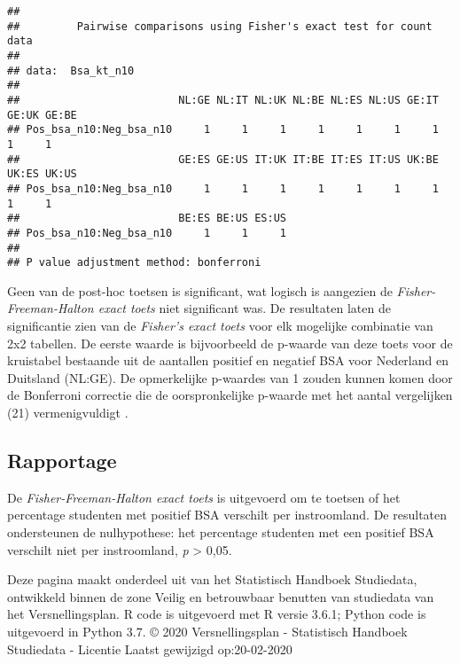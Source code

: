 \documentclass[
]{article}
\begin{document}
\begin{verbatim}
## 
##         Pairwise comparisons using Fisher's exact test for count data
## 
## data:  Bsa_kt_n10
## 
##                         NL:GE NL:IT NL:UK NL:BE NL:ES NL:US GE:IT GE:UK GE:BE
## Pos_bsa_n10:Neg_bsa_n10     1     1     1     1     1     1     1     1     1
##                         GE:ES GE:US IT:UK IT:BE IT:ES IT:US UK:BE UK:ES UK:US
## Pos_bsa_n10:Neg_bsa_n10     1     1     1     1     1     1     1     1     1
##                         BE:ES BE:US ES:US
## Pos_bsa_n10:Neg_bsa_n10     1     1     1
## 
## P value adjustment method: bonferroni
\end{verbatim}

Geen van de post-hoc toetsen is significant, wat logisch is aangezien de
\emph{Fisher-Freeman-Halton exact toets} niet significant was. De
resultaten laten de significantie zien van de \emph{Fisher's exact
toets} voor elk mogelijke combinatie van 2x2 tabellen. De eerste waarde
is bijvoorbeeld de p-waarde van deze toets voor de kruistabel bestaande
uit de aantallen positief en negatief BSA voor Nederland en Duitsland
(NL:GE). De opmerkelijke p-waardes van 1 zouden kunnen komen door de
Bonferroni correctie die de oorspronkelijke p-waarde met het aantal
vergelijken (21) vermenigvuldigt .

\hypertarget{rapportage-1}{%
\subsection{Rapportage}\label{rapportage-1}}

De \emph{Fisher-Freeman-Halton exact toets} is uitgevoerd om te toetsen
of het percentage studenten met positief BSA verschilt per instroomland.
De resultaten ondersteunen de nulhypothese: het percentage studenten met
een positief BSA verschilt niet per instroomland, \emph{p}
\textgreater{} 0,05.

\leavevmode\hypertarget{footer}{}%
Deze pagina maakt onderdeel uit van het Statistisch Handboek Studiedata,
ontwikkeld binnen de zone Veilig en betrouwbaar benutten van studiedata
van het Versnellingsplan. R code is uitgevoerd met R versie 3.6.1;
Python code is uitgevoerd in Python 3.7. © 2020 Versnellingsplan -
Statistisch Handboek Studiedata - Licentie Laatst gewijzigd
op:20-02-2020
\end{document}

